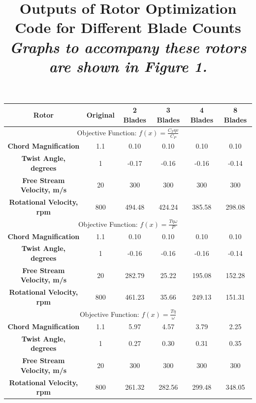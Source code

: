 \documentclass{article}
\begin{document}
\begin{table}[bp]
	\centering
	\title{Outputs of Rotor Optimization Code for Different Blade Counts \newline}
	\title{\emph{Graphs to accompany these rotors are shown in Figure 1.}} \label{table:1} \newline
	\begin{tabular}{| c | c | c | c | c | c |}
		 \hline
		 \textbf{Rotor} & Original & 2 Blades & 3 Blades & 4 Blades & 8 Blades \\ \hline
		 \multicolumn{6}{c|}{Objective Function: $ f(x) = \frac{C_{T} \eta v}{C_{P}} $} \\ \hline
		 \textbf{Chord Magnification} & 1.1 & 0.10 & 0.10 & 0.10 & 0.10 \\ \newline
		 \textbf{Twist Angle, degrees} & 1 & -0.17 & -0.16 & -0.16 & -0.14 \\ \newline
		 \textbf{Free Stream Velocity, m/s} & 20 & 300 & 300 & 300 & 300 \\ \newline
		 \textbf{Rotational Velocity, rpm} & 800 & 494.48 & 424.24 & 385.58 & 298.08 \\ \hline
		 \multicolumn{6}{c|}{Objective Function: $ f(x) = \frac{T \eta \omega}{P}  $} \\ \hline
		 \textbf{Chord Magnification} & 1.1 & 0.10 & 0.10 & 0.10 & 0.10 \\ \newline
		 \textbf{Twist Angle, degrees} & 1 & -0.16 & -0.16 & -0.16 & -0.14 \\ \newline
		 \textbf{Free Stream Velocity, m/s} & 20 & 282.79 & 25.22 & 195.08 & 152.28 \\ \newline
		 \textbf{Rotational Velocity, rpm} & 800 & 461.23 & 35.66 & 249.13 & 151.31 \\ \hline
		 \multicolumn{6}{c|}{Objective Function: $ f(x) = \frac{T \eta}{\omega} $} \\ \hline
		 \textbf{Chord Magnification} & 1.1 & 5.97 & 4.57 & 3.79 & 2.25 \\ \newline
		 \textbf{Twist Angle, degrees} & 1 & 0.27 & 0.30 & 0.31 & 0.35 \\ \newline
		 \textbf{Free Stream Velocity, m/s} & 20 & 300 & 300 & 300 & 300 \\ \newline
		 \textbf{Rotational Velocity, rpm} & 800 & 261.32 & 282.56 & 299.48 & 348.05 \\ \hline
	\end{tabular}
\end{table}
\end{document}
